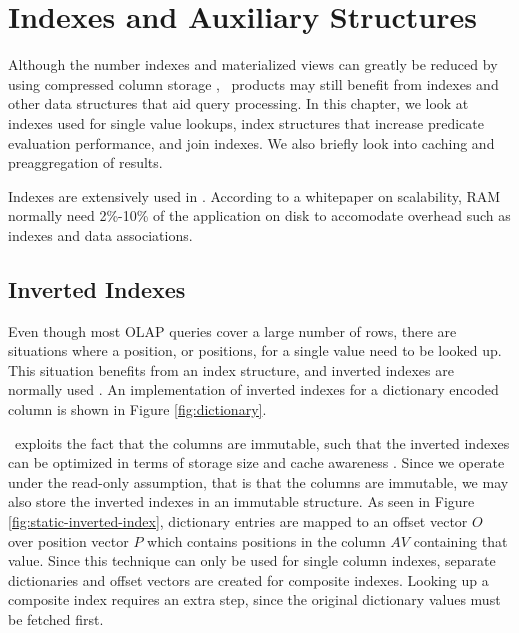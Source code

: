 \chapter{Indexes and Auxiliary Structures}
\label{chap:Indexes and Auxiliary Structures}
Although the number indexes and materialized views can greatly be reduced by using compressed column storage \cite{Lahiri2015-mz}, \bd~products may still benefit from indexes and other data structures that aid query processing. In this chapter, we look at indexes used for single value lookups, index structures that increase predicate evaluation performance, and join indexes. We also briefly look into caching and preaggregation of results.

Indexes are extensively used in \qlikview. According to a whitepaper on scalability, RAM normally need 2\%-10\% of the application on disk to accomodate overhead such as indexes and data associations.

\newpage

\section{Inverted Indexes}
\label{sec:Inverted Indexes}
Even though most OLAP queries cover a large number of rows, there are situations where a position, or positions, for a single value need to be looked up. This situation benefits from an index structure, and inverted indexes are normally used \cite{Lemke2010-is}. An implementation of inverted indexes for a dictionary encoded column is shown in Figure \ref{fig:dictionary}. 

\hyrise~exploits the fact that the columns are immutable, such that the inverted indexes can be optimized in terms of storage size and cache awareness \cite{Schwalb2014-hn}. Since we operate under the read-only assumption, that is that the columns are immutable, we may also store the inverted indexes in an immutable structure. As seen in Figure \ref{fig:static-inverted-index}, dictionary entries are mapped to an offset vector $O$ over position vector $P$ which contains positions in the column $AV$ containing that value. Since this technique can only be used for single column indexes, separate dictionaries and offset vectors are created for composite indexes. Looking up a composite index requires an extra step, since the original dictionary values must be fetched first.


